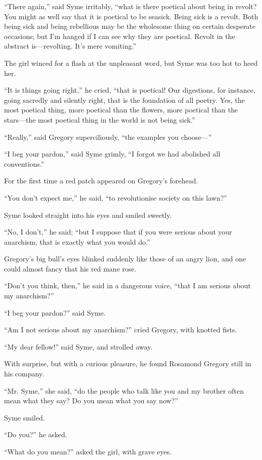 “There again,” said Syme irritably, “what is there poetical about being in revolt? You might as well say that it is poetical to be seasick. Being sick is a revolt. Both being sick and being rebellious may be the wholesome thing on certain desperate occasions; but I’m hanged if I can see why they are poetical. Revolt in the abstract is⁠—revolting. It’s mere vomiting.”

The girl winced for a flash at the unpleasant word, but Syme was too hot to heed her.

“It is things going right,” he cried, “that is poetical! Our digestions, for instance, going sacredly and silently right, that is the foundation of all poetry. Yes, the most poetical thing, more poetical than the flowers, more poetical than the stars⁠—the most poetical thing in the world is not being sick.”

“Really,” said Gregory superciliously, “the examples you choose⁠—”

“I beg your pardon,” said Syme grimly, “I forgot we had abolished all conventions.”

For the first time a red patch appeared on Gregory’s forehead.

“You don’t expect me,” he said, “to revolutionise society on this lawn?”

Syme looked straight into his eyes and smiled sweetly.

“No, I don’t,” he said; “but I suppose that if you were serious about your anarchism, that is exactly what you would do.”

Gregory’s big bull’s eyes blinked suddenly like those of an angry lion, and one could almost fancy that his red mane rose.

“Don’t you think, then,” he said in a dangerous voice, “that I am serious about my anarchism?”

“I beg your pardon?” said Syme.

“Am I not serious about my anarchism?” cried Gregory, with knotted fists.

“My dear fellow!” said Syme, and strolled away.

With surprise, but with a curious pleasure, he found Rosamond Gregory still in his company.

“Mr. Syme,” she said, “do the people who talk like you and my brother often mean what they say? Do you mean what you say now?”

Syme smiled.

“Do you?” he asked.

“What do you mean?” asked the girl, with grave eyes.

